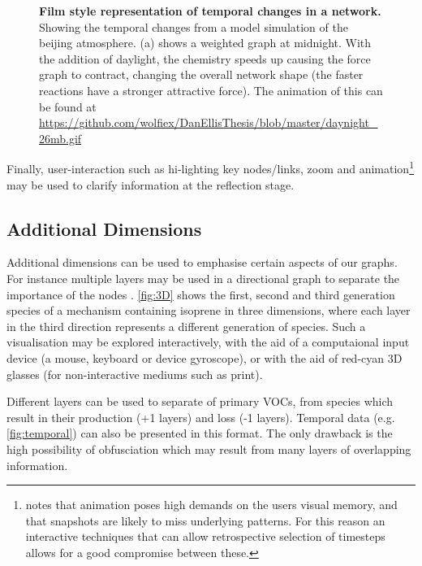 \begin{figure}[H]
\begin{subfigure}[b]{.49\textwidth}
    \caption{}
    \end{subfigure}
       \caption{\textbf{Film style representation of temporal changes in a network.} Showing the temporal changes from a model simulation of the beijing atmosphere. (a) shows a weighted graph at midnight. With the addition of daylight, the chemistry speeds up causing the force graph to contract, changing the overall network shape (the faster reactions have a stronger attractive force). The animation of this can be found at \url{https://github.com/wolfiex/DanEllisThesis/blob/master/daynight_26mb.gif}}
     \label{fig:temporal}
\end{figure}


Finally, user-interaction such as hi-lighting key nodes/links, zoom and animation\footnote{\citep{ch8} notes that animation poses high demands on the users visual memory, and that snapshots are likely to miss underlying patterns.  For this reason an interactive techniques that can allow retrospective selection of timesteps allows for a good compromise between these.} may be used to clarify information at the reflection stage.

\subsection{Additional Dimensions}
Additional dimensions can be used to emphasise certain aspects of our graphs. For instance multiple layers may be used in a directional graph to separate the importance of the nodes \citep{IPSEPCOLA}. \autoref{fig:3D} shows the first, second and third generation species of a mechanism containing isoprene in three dimensions, where each layer in the third direction represents a different generation of species. Such a visualisation may be explored interactively, with the aid of a computaional input device (a mouse, keyboard or device gyroscope), or with the aid of red-cyan 3D glasses (for non-interactive mediums such as print). 

 Different layers can be used to separate of primary VOCs, from species which result in their production (+1 layers) and loss (-1 layers).
 Temporal data (e.g. \autoref{fig:temporal}) can also be presented in this format. The only drawback is the high possibility of obfusciation which may result from many layers of overlapping information. 



